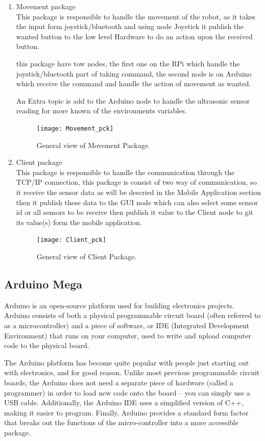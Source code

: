 	\begin{enumerate}
		\item Movement package \\ 
			This package is responsible to handle the movement of the robot, as it takes the input form joystick/bluetooth and using node Joystick it publish the wanted button to the low level Hardware to do an action upon the received button.
			
			this package have tow nodes, the first one on the RPi which handle the joystick/bluetooth part of taking command, the second node is on Arduino which receive the command and handle the action of movement as wanted.
			
			An Extra topic is add to the Arduino node to handle the ultrasonic sensor reading for more known of the environments variables. 
			\begin{figure}[h]		
				\centering
				\texttt{[image: Movement\_pck]}
				\caption{General view of Movement Package.}
				\label{Fig:Movement}
			\end{figure}
		\item Client package  \\
			This package is responsible to handle the communication through the TCP/IP connection, this package is consist of two way of communication, so it receive the sensor data as will be descried in the Mobile Application section then it publish these data to the GUI node which can also select some sensor id or all sensors to be receive then publish it value to the Client node to git its value(s) form the mobile application.
			\begin{figure}[h]		
				\centering
				\texttt{[image: Client\_pck]}
				\caption{General view of Client Package.}
				\label{Fig:Client}
			\end{figure}  
	\end{enumerate}

\subsection{Arduino Mega}
Arduino is an open-source platform used for building electronics projects. Arduino consists of both a physical programmable circuit board (often referred to as a microcontroller) and a piece of software, or IDE (Integrated Development Environment) that runs on your computer, used to write and upload computer code to the physical board.

The Arduino platform has become quite popular with people just starting out with electronics, and for good reason. Unlike most previous programmable circuit boards, the Arduino does not need a separate piece of hardware (called a programmer) in order to load new code onto the board – you can simply use a USB cable. Additionally, the Arduino IDE uses a simplified version of C++, making it easier to program. 
Finally, Arduino provides a standard form factor that breaks out the functions of the micro-controller into a more accessible package.

